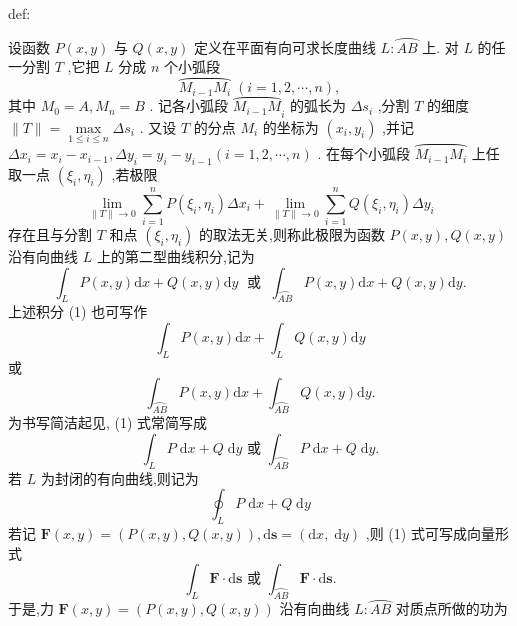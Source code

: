 \begin{definition}{}{def:}

\end{definition}
设函数 \(P\left( {x,y}\right)\) 与 \(Q\left( {x,y}\right)\) 定义在平面有向可求长度曲线 \(L : \overset{⏜}{AB}\) 上. 对 \(L\) 的任一分割 \(T\) ,它把 \(L\) 分成 \(n\) 个小弧段
\[
\overset{⏜}{{M}_{i - 1}{M}_{i}}\;\left( {i = 1,2,\cdots ,n}\right) ,
\]
其中 \({M}_{0} = A,{M}_{n} = B\) . 记各小弧段 \({\overset{⏜}{{M}_{i - 1}M}}_{i}\) 的弧长为 \(\Delta {s}_{i}\) ,分割 \(T\) 的细度 \(\parallel T\parallel  = \mathop{\max }\limits_{{1 \leq  i \leq  n}}\Delta {s}_{i}\) . 又设 \(T\) 的分点 \({M}_{i}\) 的坐标为 \(\left( {{x}_{i},{y}_{i}}\right)\) ,并记 \(\Delta {x}_{i} = {x}_{i} - {x}_{i - 1},\Delta {y}_{i} = {y}_{i} - {y}_{i - 1}\left( {i = 1,2,\cdots ,n}\right)\) . 在每个小弧段 \(\overset{⏜}{{M}_{i - 1}{M}_{i}}\) 上任取一点 \(\left( {{\xi }_{i},{\eta }_{i}}\right)\) ,若极限
\[
\mathop{\lim }\limits_{{\parallel T\parallel  \rightarrow  0}}\mathop{\sum }\limits_{{i = 1}}^{n}P\left( {{\xi }_{i},{\eta }_{i}}\right) \Delta {x}_{i} + \mathop{\lim }\limits_{{\parallel T\parallel  \rightarrow  0}}\mathop{\sum }\limits_{{i = 1}}^{n}Q\left( {{\xi }_{i},{\eta }_{i}}\right) \Delta {y}_{i}
\]
存在且与分割 \(T\) 和点 \(\left( {{\xi }_{i},{\eta }_{i}}\right)\) 的取法无关,则称此极限为函数 \(P\left( {x,y}\right) ,Q\left( {x,y}\right)\) 沿有向曲线 \(L\) 上的第二型曲线积分,记为
\[
{\int }_{L}P\left( {x,y}\right) \mathrm{d}x + Q\left( {x,y}\right) \mathrm{d}y\;\text{ 或 }\;{\int }_{\overset{⏜}{AB}}P\left( {x,y}\right) \mathrm{d}x + Q\left( {x,y}\right) \mathrm{d}y. \tag{1}
\]
上述积分 (1) 也可写作
\[
{\int }_{L}P\left( {x,y}\right) \mathrm{d}x + {\int }_{L}Q\left( {x,y}\right) \mathrm{d}y
\]
或
\[
{\int }_{\overset{⏜}{AB}}P\left( {x,y}\right) \mathrm{d}x + {\int }_{\overset{⏜}{AB}}Q\left( {x,y}\right) \mathrm{d}y.
\]
为书写简洁起见, (1) 式常简写成
\[
{\int }_{L}P\mathrm{\;d}x + Q\mathrm{\;d}y\text{ 或 }{\int }_{\overset{⏜}{AB}}P\mathrm{\;d}x + Q\mathrm{\;d}y.
\]
若 \(L\) 为封闭的有向曲线,则记为
\[
{\oint }_{L}P\mathrm{\;d}x + Q\mathrm{\;d}y \tag{2}
\]
若记 \(\mathbf{F}\left( {x,y}\right)  = \left( {P\left( {x,y}\right) ,Q\left( {x,y}\right) }\right) ,\mathrm{d}\mathbf{s} = \left( {\mathrm{d}x,\mathrm{\;d}y}\right)\) ,则 (1) 式可写成向量形式
\[
{\int }_{L}\mathbf{F} \cdot  \mathrm{d}\mathbf{s}\text{ 或 }{\int }_{\overset{⏜}{AB}}\mathbf{F} \cdot  \mathrm{d}\mathbf{s}. \tag{3}
\]
于是,力 \(\mathbf{F}\left( {x,y}\right)  = \left( {P\left( {x,y}\right) ,Q\left( {x,y}\right) }\right)\) 沿有向曲线 \(L : \overset{⏜}{AB}\) 对质点所做的功为

